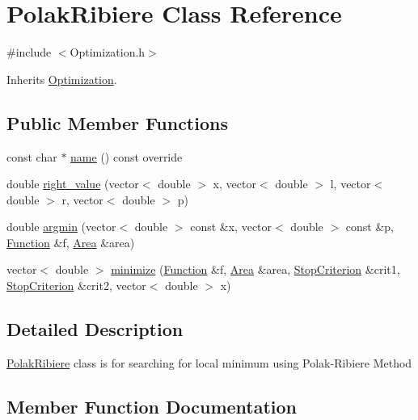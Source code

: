 \hypertarget{class_polak_ribiere}{}\section{Polak\+Ribiere Class Reference}
\label{class_polak_ribiere}


{\ttfamily \#include $<$Optimization.\+h$>$}



Inherits \hyperlink{class_optimization}{Optimization}.

\subsection*{Public Member Functions}
\begin{DoxyCompactItemize}
\item 
const char $\ast$ \hyperlink{class_polak_ribiere_a2a69c824b56e097a012d32c97ab021fd}{name} () const override
\item 
double \hyperlink{class_polak_ribiere_ad73be8a4a015c7c53f729b738d490ed6}{right\+\_\+value} (vector$<$ double $>$ x, vector$<$ double $>$ l, vector$<$ double $>$ r, vector$<$ double $>$ p)
\item 
double \hyperlink{class_polak_ribiere_a712890f0e14a88f0cb64ce2e11be3b05}{argmin} (vector$<$ double $>$ const \&x, vector$<$ double $>$ const \&p, \hyperlink{class_function}{Function} \&f, \hyperlink{class_area}{Area} \&area)
\item 
vector$<$ double $>$ \hyperlink{class_polak_ribiere_ac35468cd175f30fdeae7cb023f0dadf7}{minimize} (\hyperlink{class_function}{Function} \&f, \hyperlink{class_area}{Area} \&area, \hyperlink{class_stop_criterion}{Stop\+Criterion} \&crit1, \hyperlink{class_stop_criterion}{Stop\+Criterion} \&crit2, vector$<$ double $>$ x)
\end{DoxyCompactItemize}


\subsection{Detailed Description}
\hyperlink{class_polak_ribiere}{Polak\+Ribiere} class is for searching for local minimum using Polak-\/\+Ribiere Method 

\subsection{Member Function Documentation}
\mbox{\label{class_polak_ribiere_a712890f0e14a88f0cb64ce2e11be3b05}} 

